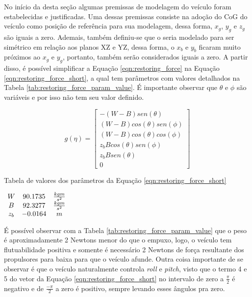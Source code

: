 No início da desta seção algumas premissas de modelagem do veículo foram estabelecidas e justificadas. Uma dessas premissas consiste na adoção do CoG do veículo como posição de referência para sua modelagem, dessa forma, $x_g$, $y_g$ e $z_g$ são iguais a zero. Ademais, também definiu-se que o seria modelado para ser simétrico em relação aos planos XZ e YZ, dessa forma, o $x_b$ e $y_b$ ficaram muito próximos ao $x_g$ e $y_g$, portanto, também serão considerados iguais a zero. A partir disso, é possível simplificar a Equação \ref{eqn:restoring_force} na Equação \ref{eqn:restoring_force_short}, a qual tem parâmetros com valores detalhados na Tabela \ref{tab:restoring_force_param_value}. É importante observar que $\theta$ e $\phi$ são variáveis e por isso não tem seu valor definido.

\begin{equation}
	\label{eqn:restoring_force_short}
	g(\eta) =
	\begin{bmatrix}
		-(W-B)sen(\theta)\\
		(W-B)cos(\theta)sen(\phi)\\
		(W-B)cos(\theta)cos(\phi)\\
		z_bBcos(\theta)sen(\phi)\\		
		z_bBsen(\theta)\\
		0
	\end{bmatrix}  
\end{equation}

\begin{table}[H]
	\centering
	\label{tab:restoring_force_param_value}
	\caption{Tabela de valores dos parâmetros da Equação \ref{eqn:restoring_force_short}}
	$\begin{array}{c c c}
		\begin{matrix} 
			W & 90.1735 & \frac{kgm}{s^{2}} \\ 
			B &  92.3277 & \frac{kgm}{s^{2}} \\
			z_b &  -0.0164 & m
		\end{matrix}
	\end{array}$
\end{table}

É possível observar com a Tabela \ref{tab:restoring_force_param_value} que o peso é aproximadamente 2 Newtons menor do que o empuxo, logo, o veículo tem flutuabilidade positiva e somente é necessário 2 Newtons de força resultante dos propulsores para baixa para que o veículo afunde. Outra coisa importante de se observar é que o veículo naturalmente controla \textit{roll} e \textit{pitch}, visto que o termo 4 e 5 do vetor da Equação \ref{eqn:restoring_force_short} no intervalo de zero a $\frac{\pi}{2}$ é negativo e de $\frac{-\pi}{2}$ a zero é positivo, sempre levando esses ângulos pra zero.

